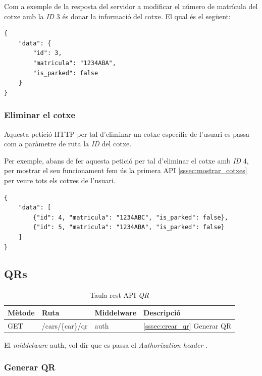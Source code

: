 Com a exemple de la resposta del servidor a modificar el número de matrícula del cotxe amb la \emph{ID} 3
és donar la informació del cotxe. El qual és el següent:
\begin{verbatim}
{
    "data": {
        "id": 3,
        "matricula": "1234ABA",
        "is_parked": false
    }
}
\end{verbatim}

\subsubsection{Eliminar el cotxe}
\label{sssec:eliminar_cotxe}

Aquesta petició HTTP per tal d'eliminar un cotxe específic de l'usuari es passa com a
paràmetre de ruta la \emph{ID} del cotxe.

Per exemple, abans de fer aquesta petició per tal d'eliminar el cotxe amb \emph{ID} 4,
per mostrar el seu funcionament fem ús la primera API \autoref{sssec:mostrar_cotxes}
per veure tots els cotxes de l'usuari.
\begin{verbatim}
{
    "data": [
        {"id": 4, "matricula": "1234ABC", "is_parked": false},
        {"id": 5, "matricula": "1234ABA", "is_parked": false}
    ]
}
\end{verbatim}

\subsection{QRs}

\begin{table}[H]
\centering
\begin{tabular}{llll}
\hline
\textbf{Mètode} & \textbf{Ruta} & \textbf{Middelware} & \textbf{Descripció} \\ \hline
GET             & /cars/\{car\}/qr   &  auth  &  \autoref{sssec:crear_qr}{ Generar QR}     \\ \hline
\end{tabular}
\caption{Taula rest API \emph{QR}}
\label{tab:my-QR-api-table}
\end{table}

El \emph{middelware} auth, vol dir que es passa el \emph{Authorization header} \autocite{middleware_laravel}.

\subsubsection{Generar QR}
\label{sssec:crear_qr}

